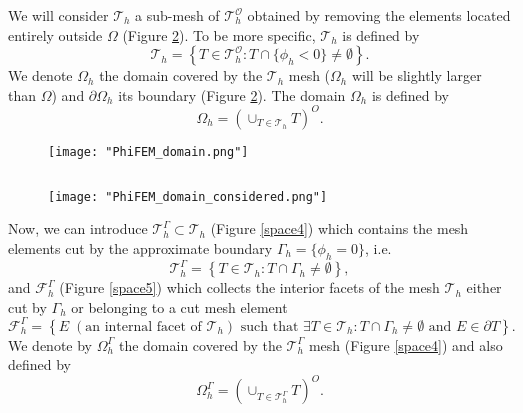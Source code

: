 We will consider $\mathcal{T}_h$ a sub-mesh of $\mathcal{T}_h^\mathcal{O}$ obtained by removing the elements located entirely outside $\Omega$ (Figure \ref{space3}). To be more specific, $\mathcal{T}_h$ is defined by
\begin{equation*}
	\mathcal{T}_h=\left\{T\in \mathcal{T}_h^\mathcal{O}:T\cap\{\phi_h<0\}\ne\emptyset\right\}.
\end{equation*}
We denote $\Omega_h$ the domain covered by the $\mathcal{T}_h$ mesh ($\Omega_h$ will be slightly larger than $\Omega$) and $\partial\Omega_h$ its boundary (Figure \ref{space3}). The domain $\Omega_h$ is defined by
\begin{equation*}
	\Omega_h=\left(\cup_{T\in\mathcal{T}_h}T\right)^O.
\end{equation*}

\begin{minipage}{0.52\linewidth}
	\begin{figure}[H]
		\centering
		\texttt{[image: "PhiFEM\_domain.png"]}
		\label{space2}
	\end{figure}
\end{minipage} $\qquad$
\begin{minipage}{0.44\linewidth}
	\begin{figure}[H]
		\centering
		\texttt{[image: "PhiFEM\_domain\_considered.png"]}
		\label{space3}
	\end{figure}
\end{minipage}

Now, we can introduce $\mathcal{T}_h^\Gamma\subset \mathcal{T}_h$ (Figure \ref{space4}) which contains the mesh elements cut by the
approximate boundary $\Gamma_h = \{\phi_h=0\}$, i.e. 
\begin{equation*}
	\mathcal{T}_h^\Gamma=\left\{T\in \mathcal{T}_h:T\cap\Gamma_h\ne\emptyset\right\},
\end{equation*}
and $\mathcal{F}_h^\Gamma$ (Figure \ref{space5}) which collects the interior facets of the mesh $\mathcal{T}_h$ either cut by $\Gamma_h$ or belonging to a cut mesh element
\begin{equation*}
	\mathcal{F}_h^\Gamma=\left\{E\;(\text{an internal facet of } \mathcal{T}_h) \text{ such that } \exists T\in \mathcal{T}_h:T\cap\Gamma_h\ne\emptyset \text{ and } E\in\partial T\right\}.
\end{equation*}
We denote by $\Omega_h^\Gamma$ the domain covered by the $\mathcal{T}_h^\Gamma$ mesh (Figure \ref{space4}) and also defined by
\begin{equation*}
	\Omega_h^\Gamma=\left(\cup_{T\in\mathcal{T}_h^\Gamma}T\right)^O.
\end{equation*}

